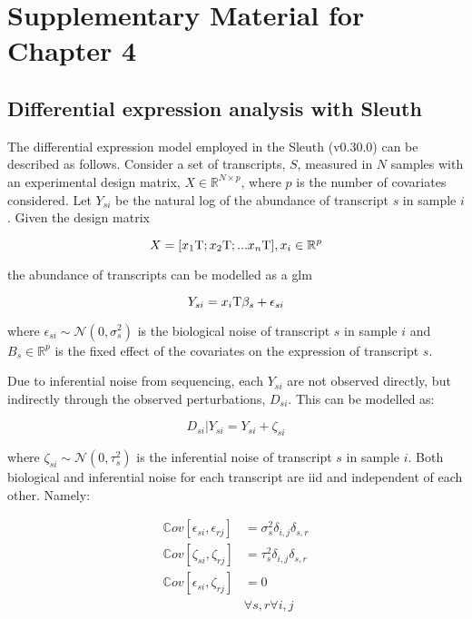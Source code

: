 \chapter{Supplementary Material for Chapter 4}

\section{Differential expression analysis with Sleuth}

The differential expression model employed in the Sleuth (v0.30.0) \cite{pimentelDifferentialAnalysisRNAseq2017,yiGenelevelDifferentialAnalysis2018} can be described as follows.
Consider a set of transcripts, $S$, measured in $N$ samples with an experimental design matrix, $X \in \mathbb{R}^{N \times p}$, where $p$ is the number of covariates considered.
Let $Y_{si}$ be the natural log of the abundance of transcript $s$ in sample $i$.
Given the design matrix

\begin{equation*}
  X = [x_1\mathrm{T}; x_2\mathrm{T}; ... x_n\mathrm{T}], x_i \in \mathbb{R}^p
\end{equation*}

the abundance of transcripts can be modelled as a \gls{glm}

\begin{equation}
  Y_{si} = x_i\mathrm{T} \beta_s + \epsilon_{si}
\end{equation}

where $\epsilon_{si} \sim \mathcal{N}(0, \sigma_s^2)$ is the biological noise of transcript $s$ in sample $i$ and $B_s \in \mathbb{R}^p$ is the fixed effect of the covariates on the expression of transcript $s$.

Due to inferential noise from sequencing, each $Y_{si}$ are not observed directly, but indirectly through the observed perturbations, $D_{si}$.
This can be modelled as:

\begin{equation}
  D_{si} | Y_{si} = Y_{si} + \zeta_{si}
\end{equation}

where $\zeta_{si} \sim \mathcal{N}(0, \tau_s^2)$ is the inferential noise of transcript $s$ in sample $i$.
Both biological and inferential noise for each transcript are \gls{iid} and independent of each other.
Namely:

\begin{align*}
  \mathbb{C}ov [\epsilon_{si}, \epsilon_{rj}] & = \sigma_s^2\delta_{i,j}\delta_{s,r} \\
  \mathbb{C}ov [\zeta_{si}, \zeta_{rj}]       & = \tau_s^2\delta_{i,j}\delta_{s,r}   \\
  \mathbb{C}ov [\epsilon_{si}, \zeta_{rj}]    & = 0                                  \\
                                              & \forall s,r \forall i,j
\end{align*}

